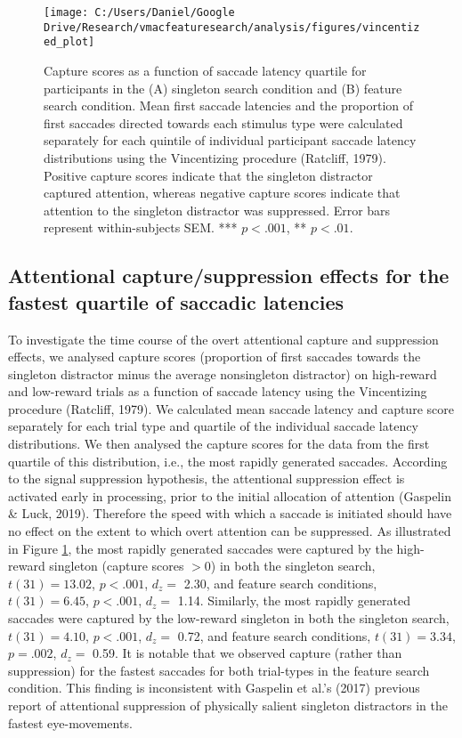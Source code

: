 \documentclass[jou, a4paper, noextraspace,floatsintext]{apa6}
\theoremstyle{definition}
\theoremstyle{definition}
\theoremstyle{definition}
\theoremstyle{remark}
\begin{document}
\begin{figure}

{\centering \texttt{[image: C:/Users/Daniel/Google Drive/Research/vmacfeaturesearch/analysis/figures/vincentized\_plot]} 

}

\caption{Capture scores as a function of saccade latency
quartile for participants in the (A) singleton search condition and (B)
feature search condition. Mean first saccade latencies and the
proportion of first saccades directed towards each stimulus type were
calculated separately for each quintile of individual participant
saccade latency distributions using the Vincentizing procedure
(Ratcliff, 1979). Positive capture scores indicate that the singleton
distractor captured attention, whereas negative capture scores indicate
that attention to the singleton distractor was suppressed. Error bars
represent within-subjects SEM. *** \(p<.001\), ** \(p<.01\).}\label{fig:VincentizedPlot}
\end{figure}

\subsection{Attentional capture/suppression effects for the fastest
quartile of saccadic
latencies}\label{attentional-capturesuppression-effects-for-the-fastest-quartile-of-saccadic-latencies}

To investigate the time course of the overt attentional capture and
suppression effects, we analysed capture scores (proportion of first
saccades towards the singleton distractor minus the average nonsingleton
distractor) on high-reward and low-reward trials as a function of
saccade latency using the Vincentizing procedure (Ratcliff, 1979). We
calculated mean saccade latency and capture score separately for each
trial type and quartile of the individual saccade latency distributions.
We then analysed the capture scores for the data from the first quartile
of this distribution, i.e., the most rapidly generated saccades.
According to the signal suppression hypothesis, the attentional
suppression effect is activated early in processing, prior to the
initial allocation of attention (Gaspelin \& Luck, 2019). Therefore the
speed with which a saccade is initiated should have no effect on the
extent to which overt attention can be suppressed. As illustrated in
Figure \ref{fig:VincentizedPlot}, the most rapidly generated saccades
were captured by the high-reward singleton (capture scores \(>0\)) in
both the singleton search, \(t(31) = 13.02\), \(p < .001\), \(d_z=\)
2.30, and feature search conditions, \(t(31) = 6.45\), \(p < .001\),
\(d_z=\) 1.14. Similarly, the most rapidly generated saccades were
captured by the low-reward singleton in both the singleton search,
\(t(31) = 4.10\), \(p < .001\), \(d_z=\) 0.72, and feature search
conditions, \(t(31) = 3.34\), \(p = .002\), \(d_z=\) 0.59. It is notable
that we observed capture (rather than suppression) for the fastest
saccades for both trial-types in the feature search condition. This
finding is inconsistent with Gaspelin et al.'s (2017) previous report of
attentional suppression of physically salient singleton distractors in
the fastest eye-movements.
\end{document}
